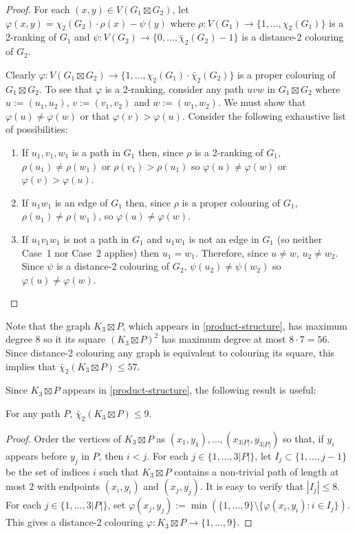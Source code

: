 \documentclass[kpfonts]{patmorin}
\newcommand{\trn}{\chi_2}
\newcommand{\dtcn}{\bar{\chi}_2}
\theoremstyle{named}
\begin{document}
\begin{proof}
    For each $(x,y)\in V(G_1\boxtimes G_2)$, let $\varphi(x,y)=\trn(G_2)\cdot \rho(x) - \psi(y)$ where $\rho:V(G_1)\to\{1,\ldots,\trn(G_1)\}$ is a 2-ranking of $G_1$ and $\psi:V(G_2)\to\{0,\ldots,\dtcn(G_2)-1\}$ is a distance-2 colouring of $G_2$.

    Clearly $\varphi:V(G_1\boxtimes G_2)\to \{1,\ldots,\trn(G_1)\cdot\dtcn(G_2)\}$ is a proper colouring of $G_1\boxtimes G_2$.  To see that $\varphi$ is a 2-ranking, consider any path $uvw$ in $G_1\boxtimes G_2$ where $u:=(u_1,u_2)$, $v:=(v_1,v_2)$ and $w:=(w_1,w_2)$.  We must show that $\varphi(u)\neq\varphi(w)$ or that $\varphi(v)>\varphi(u)$.  Consider the following exhaustive list of possibilities:
    \begin{enumerate}
        \item If $u_1,v_1,w_1$ is a path in $G_1$ then, since $\rho$ is a 2-ranking of $G_1$, $\rho(u_1)\neq\rho(w_1)$ or $\rho(v_1)>\rho(u_1)$ so $\varphi(u)\neq \varphi(w)$ or $\varphi(v)>\varphi(u)$.

        \item If $u_1w_1$ is an edge of $G_1$ then, since $\rho$ is a proper colouring of $G_1$, $\rho(u_1)\neq\rho(w_1)$, so $\varphi(u)\neq\varphi(w)$.

        \item If $u_1v_1w_1$ is not a path in $G_1$ and $u_1w_1$ is not an edge in $G_1$ (so neither Case~1 nor Case~2 applies) then $u_1=w_1$.  Therefore, since $u\neq w$, $u_2\neq w_2$. Since $\psi$ is a distance-2 colouring of $G_2$, $\psi(u_2)\neq\psi(w_2)$ so $\varphi(u)\neq\varphi(w)$.
         \qedhere
    \end{enumerate}
\end{proof}

Note that the graph $K_3\boxtimes P$, which appears in \cref{product-structure}, has maximum degree 8 so it its square $(K_3\boxtimes P)^2$ has maximum degree at most $8\cdot 7=56$.  Since distance-2 colouring any graph is equivalent to colouring its square, this implies that $\dtcn(K_3\boxtimes P)\le 57$.


Since $K_3\boxtimes P$ appears in \cref{product-structure}, the following result is useful:

\begin{lem}\label{dumb}
    For any path $P$, $\dtcn(K_3\boxtimes P)\le 9$.
\end{lem}

\begin{proof}
    Order the vertices of $K_3\boxtimes P$ as $(x_1,y_1),\ldots,(x_{3|P|},y_{3|P|})$ so that, if $y_i$ appears before $y_j$ in $P$, then $i<j$. For each $j\in\{1,\ldots,3|P|\}$, let $I_j\subset\{1,\ldots,j-1\}$ be the set of indices $i$ such that $K_3\boxtimes P$ contains a non-trivial path of length at most 2 with endpoints $(x_i,y_i)$ and $(x_j,y_j)$.  It is easy to verify that $|I_j|\le 8$.  For each $j\in\{1,\ldots,3|P|\}$, set $\varphi(x_j,y_j):=\min(\{1,\ldots,9\}\setminus\{\varphi(x_i,y_i):i\in I_j\})$.  This gives a distance-2 colouring $\varphi:K_3\boxtimes P\to\{1,\ldots,9\}$.
\end{proof}
\end{document}
